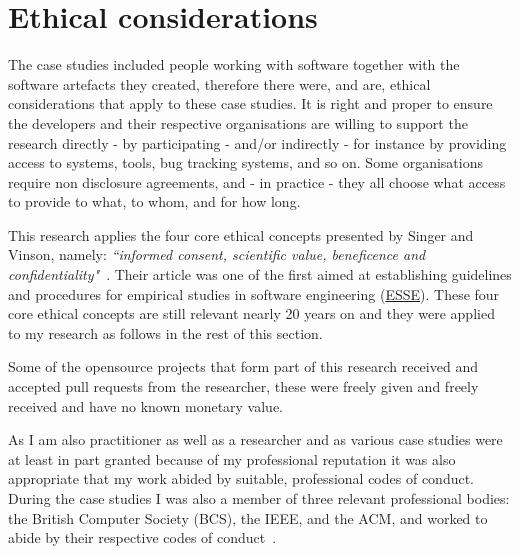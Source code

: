 \section{Ethical considerations}
\label{methodology-ethical-considerations-section}
The case studies included people working with software together with the software artefacts they created, therefore there were, and are, ethical considerations that apply to these case studies. 
It is right and proper to ensure the developers and their respective organisations are willing to support the research directly - by participating - and/or indirectly - for instance by providing access to systems, tools, bug tracking systems, and so on. Some organisations require non disclosure agreements, and - in practice - they all choose what access to provide to what, to whom, and for how long. 


This research applies the four core ethical concepts presented by Singer and Vinson, namely: \emph{``informed consent, scientific value, beneficence and confidentiality"}~\citep[p.1178]{singer2002_ethical_issues_in_empirical_studies_of_software_engineering}. Their article was one of the first aimed at establishing guidelines and procedures for empirical studies in software engineering (\href{glossary-esse}{ESSE}). These four core ethical concepts are still relevant nearly 20 years on and they were applied to my research as follows in the rest of this section.



Some of the opensource projects that form part of this research received and accepted pull requests from the researcher, these were freely given and freely received and have no known monetary value.


As I am also practitioner as well as a researcher and as various case studies were at least in part granted because of my professional reputation it was also appropriate that my work abided by suitable, professional codes of conduct.   
During the case studies I was also a member of three relevant professional bodies: the British Computer Society (BCS), the IEEE, and the ACM, and worked to abide by their respective codes of conduct~\citep{bcs_code_of_conduct_2021, ieee_and_acm_code_1999on}.


